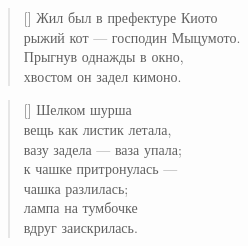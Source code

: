 \documentclass[a5paper,11pt]{memoir}
\begin{document}
\newpage
\hfill
{}
\BgThispage
\newpage


\PlainPoemTitle
{}
\begin{verse}[\versewidth]
Жил был в префектуре Киото\\
рыжий кот --- господин Мыцумото.\\
Прыгнув однажды в окно, \\
хвостом он задел кимоно. 
\end{verse}

\begin{verse}[\versewidth]
\hspace{-1cm}Шелком шурша\\
\hspace{-1cm}вещь как листик летала,\\
\hspace{-1cm}вазу задела --- ваза упала;\\
\hspace{-1cm}к чашке притронулась ---\\
\hspace{-1cm}чашка разлилась;\\
\hspace{-1cm}лампа на тумбочке\\
\hspace{-1cm}вдруг заискрилась.
\end{verse}
\end{document}
